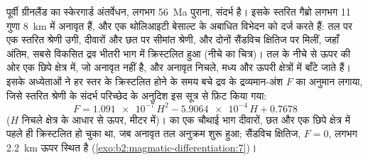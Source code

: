 पूर्वी ग्रीनलैंड का स्केरगार्ड अंतर्वेधन, लगभग \qty{56}{Ma} पुराना,
संदर्भ है। इसके स्तरित गैब्रो लगभग 11 गुणा \qty{8}{km} में अनावृत हैं, और एक
थोलिआइटी बेसाल्ट के अबाधित विभेदन को दर्ज करते हैं: तल पर एक स्तरित श्रेणी उगी,
दीवारों और छत पर सीमांत श्रेणी, और दोनों सैंडविच क्षितिज पर मिलीं,
जहाँ अंतिम, सबसे विकसित द्रव भीतरी भाग में क्रिस्टलित हुआ (नीचे का चित्र)।
तल के  नीचे से ऊपर की ओर एक छिपे क्षेत्र में, जो अनावृत नहीं है,
और अनावृत निचले, मध्य और ऊपरी क्षेत्रों में बाँटे जाते हैं। इसके
अध्येताओं ने हर स्तर के क्रिस्टलित होने के समय बचे द्रव के द्रव्यमान-अंश $F$ का अनुमान लगाया, जिसे
स्तरित श्रेणी के संदर्भ परिच्छेद के अनुदिश इस सूत्र से फ़िट किया गया:
\[
F = \num{1.091e-7}\,H^2 - \num{5.9064e-4}\,H + 0.7678
\]
($H$ निचले क्षेत्र के आधार से ऊपर, मीटर में)।  का एक चौथाई भाग
दीवारों, छत और एक छिपे क्षेत्र में पहले ही क्रिस्टलित हो चुका था, जब अनावृत तल
अनुक्रम शुरू हुआ; सैंडविच क्षितिज, $F = 0$, लगभग \qty{2.2}{km} ऊपर स्थित है
(\cref{exo:b2:magmatic-differentiation:7})।

